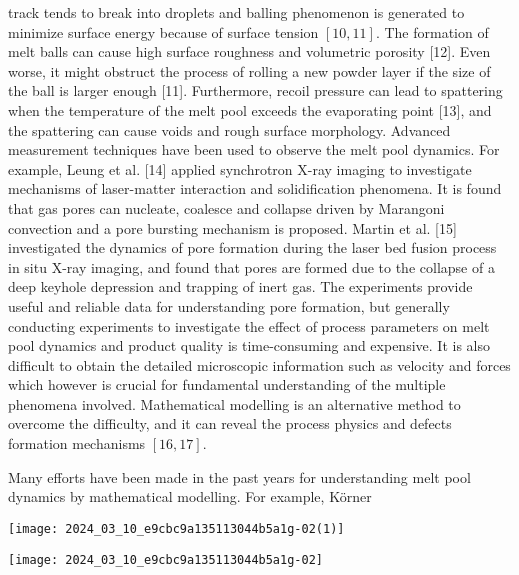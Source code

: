 \documentclass[10pt]{article}
\begin{document}
track tends to break into droplets and balling phenomenon is generated to minimize surface energy because of surface tension $[10,11]$. The formation of melt balls can cause high surface roughness and volumetric porosity [12]. Even worse, it might obstruct the process of rolling a new powder layer if the size of the ball is larger enough [11]. Furthermore, recoil pressure can lead to spattering when the temperature of the melt pool exceeds the evaporating point [13], and the spattering can cause voids and rough surface morphology. Advanced measurement techniques have been used to observe the melt pool dynamics. For example, Leung et al. [14] applied synchrotron X-ray imaging to investigate mechanisms of laser-matter interaction and solidification phenomena. It is found that gas pores can nucleate, coalesce and collapse driven by Marangoni convection and a pore bursting mechanism is proposed. Martin et al. [15] investigated the dynamics of pore formation during the laser bed fusion process in situ X-ray imaging, and found that pores are formed due to the collapse of a deep keyhole depression and trapping of inert gas. The experiments provide useful and reliable data for understanding pore formation, but generally conducting experiments to investigate the effect of process parameters on melt pool dynamics and product quality is time-consuming and expensive. It is also difficult to obtain the detailed microscopic information such as velocity and forces which however is crucial for fundamental understanding of the multiple phenomena involved. Mathematical modelling is an alternative method to overcome the difficulty, and it can reveal the process physics and defects formation mechanisms $[16,17]$.

Many efforts have been made in the past years for understanding melt pool dynamics by mathematical modelling. For example, Körner

\begin{center}
\texttt{[image: 2024\_03\_10\_e9cbc9a135113044b5a1g-02(1)]}
\end{center}

\begin{center}
\texttt{[image: 2024\_03\_10\_e9cbc9a135113044b5a1g-02]}
\end{center}
\end{document}

